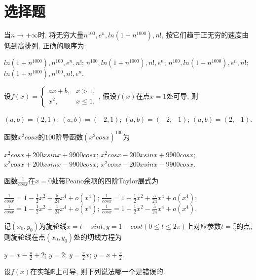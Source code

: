 \documentclass{exam}
\begin{document}
\section{选择题}
\begin{questions}
    \question[3]当$n \to +\infty$时, 将无穷大量$n^{100}, e^n, ln(1+n^{1000}), n!$, 按它们趋于正无穷的速度由低到高排列, 正确的顺序为: 
    \begin{choices}
        \choice $ln(1+n^{1000}), n^{100}, e^n, n!$;
        \choice $n^{100}, ln(1+n^{1000}), n!, e^n$;
        \choice $n^{100}, ln(1+n^{1000}), e^n, n!$;
        \choice $ln(1+n^{1000}), n^{100}, n!, e^n$.
    \end{choices}
    \question[3]设$f(x)=
    \begin{cases}
        ax+b,& x > 1, \\
        x^2,& x \leq 1.
    \end{cases}$, 假设$f(x)$在点$x=1$处可导, 则
    \begin{choices}
        \choice $(a, b)=(2, 1)$;
        \choice $(a, b)=(-2, 1)$;
        \choice $(a, b)=(-2, -1)$;
        \choice $(a, b)=(2, -1)$.
    \end{choices}
    \question[3]函数$x^2cos x$的$100$阶导函数$(x^2cos x)^{100}$为
    \begin{choices}
        \choice $x^2cos x+200xsin x+9900cosx$;
        \choice $x^2cos x-200xsin x+9900cosx$;
        \choice $x^2cos x+200xsin x-9900cosx$;
        \choice $x^2cos x-200xsin x-9900cosx$.
    \end{choices}
    \question[3]函数$\frac{1}{cos x}$在$x=0$处带Peano余项的四阶Taylor展式为
    \begin{choices}
        \choice $\frac{1}{cos x}=1-\frac{1}{2}x^2+\frac{5}{24}x^4+o(x^4)$;
        \choice $\frac{1}{cos x}=1+\frac{1}{2}x^2+\frac{5}{24}x^4+o(x^4)$;
        \choice $\frac{1}{cos x}=1-\frac{1}{2}x^2+\frac{1}{24}x^4+o(x^4)$;
        \choice $\frac{1}{cos x}=1+\frac{1}{2}x^2-\frac{5}{24}x^4+o(x^4)$.
    \end{choices}
    \question[3]记$(x_0,y_0)$为旋轮线$x=t-sin t, y=1-cos t (0 \leq t \leq 2\pi)$上对应参数$t=\frac{\pi}{2}$的点, 则旋轮线在点$(x_0,y_0)$处的切线方程为
    \begin{choices}
        \choice $y=x-\frac{\pi}{2}+2$;
        \choice $y=2$;
        \choice $y=\frac{\pi}{2}x$;
        \choice $y=x+\frac{\pi}{2}$.
    \end{choices}
    \question[3]设$f(x)$在实轴$\mathbb{R}$上可导, 则下列说法哪一个是错误的.
    \begin{choices}

\end{choices}
\end{questions}
\end{document}
